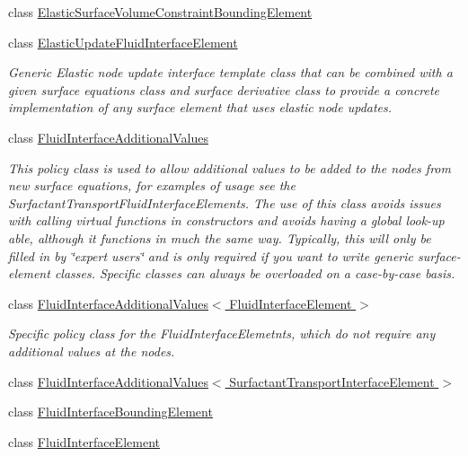 \begin{DoxyCompactItemize}
class \hyperlink{classoomph_1_1ElasticSurfaceVolumeConstraintBoundingElement}{Elastic\+Surface\+Volume\+Constraint\+Bounding\+Element}
\item 
class \hyperlink{classoomph_1_1ElasticUpdateFluidInterfaceElement}{Elastic\+Update\+Fluid\+Interface\+Element}
\begin{DoxyCompactList}\small\item\em Generic Elastic node update interface template class that can be combined with a given surface equations class and surface derivative class to provide a concrete implementation of any surface element that uses elastic node updates. \end{DoxyCompactList}\item 
class \hyperlink{classoomph_1_1FluidInterfaceAdditionalValues}{Fluid\+Interface\+Additional\+Values}
\begin{DoxyCompactList}\small\item\em This policy class is used to allow additional values to be added to the nodes from new surface equations, for examples of usage see the Surfactant\+Transport\+Fluid\+Interface\+Elements. The use of this class avoids issues with calling virtual functions in constructors and avoids having a global look-\/up able, although it functions in much the same way. Typically, this will only be filled in by \char`\"{}expert users\char`\"{} and is only required if you want to write generic surface-\/element classes. Specific classes can always be overloaded on a case-\/by-\/case basis. \end{DoxyCompactList}\item 
class \hyperlink{classoomph_1_1FluidInterfaceAdditionalValues_3_01FluidInterfaceElement_01_4}{Fluid\+Interface\+Additional\+Values$<$ Fluid\+Interface\+Element $>$}
\begin{DoxyCompactList}\small\item\em Specific policy class for the Fluid\+Interface\+Elemetnts, which do not require any additional values at the nodes. \end{DoxyCompactList}\item 
class \hyperlink{classoomph_1_1FluidInterfaceAdditionalValues_3_01SurfactantTransportInterfaceElement_01_4}{Fluid\+Interface\+Additional\+Values$<$ Surfactant\+Transport\+Interface\+Element $>$}
\item 
class \hyperlink{classoomph_1_1FluidInterfaceBoundingElement}{Fluid\+Interface\+Bounding\+Element}
\item 
class \hyperlink{classoomph_1_1FluidInterfaceElement}{Fluid\+Interface\+Element}

\end{DoxyCompactItemize}
